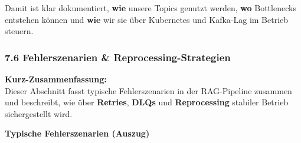 Damit ist klar dokumentiert, \textbf{wie} unsere Topics genutzt werden,
\textbf{wo} Bottlenecks entstehen können und \textbf{wie} wir sie über
Kubernetes und Kafka-Lag im Betrieb steuern.

\subsubsection{7.6 Fehlerszenarien \&
Reprocessing-Strategien}\label{fehlerszenarien-reprocessing-strategien}

\textbf{Kurz-Zusammenfassung:}\\
Dieser Abschnitt fasst typische Fehlerszenarien in der RAG-Pipeline
zusammen und beschreibt, wie über \textbf{Retries}, \textbf{DLQs} und
\textbf{Reprocessing} stabiler Betrieb sichergestellt wird.

\textbf{Typische Fehlerszenarien (Auszug)}

